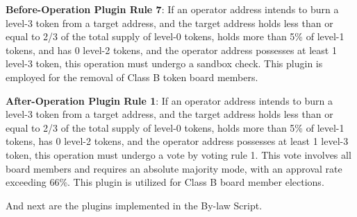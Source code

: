 \documentclass[main.tex]{subfiles}
\begin{document}
\textbf{Before-Operation Plugin Rule 7}: If an operator address intends to burn a level-3 token from a target address, and the target address holds less than or equal to 2/3 of the total supply of level-0 tokens, holds more than 5\% of level-1 tokens, and has 0 level-2 tokens, and the operator address possesses at least 1 level-3 token, this operation must undergo a sandbox check. This plugin is employed for the removal of Class B token board members.


\textbf{After-Operation Plugin Rule 1}: If an operator address intends to burn a level-3 token from a target address, and the target address holds less than or equal to 2/3 of the total supply of level-0 tokens, holds more than 5\% of level-1 tokens, has 0 level-2 tokens, and the operator address possesses at least 1 level-3 token, this operation must undergo a vote by voting rule 1. This vote involves all board members and requires an absolute majority mode, with an approval rate exceeding 66\%. This plugin is utilized for Class B board member elections.

And next are the plugins implemented in the By-law Script.
\end{document}

